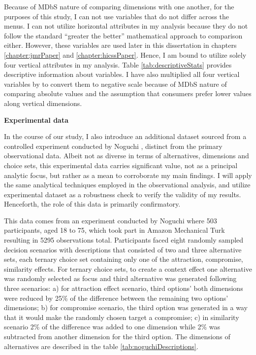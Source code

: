 \documentclass[a4paper,12pt]{article}
\newcommand{\citeyearonly}[1]{\citeyearpar{#1}}
\begin{document}
Because of MDbS nature of comparing dimensions with one another, for the purposes of this study, I can not use variables that do not differ across the menus. I can not utilize horizontal attributes in my analysis because they do not follow the standard ``greater the better'' mathematical approach to comparison either. However, these variables are used later in this dissertation in chapters \ref{chapter:jmrPaper} and \ref{chapter:hicssPaper}. Hence, I am bound to utilize solely four vertical attributes in my analysis. Table \ref{tab:descriptiveStats} provides descriptive information about variables. I have also multiplied all four vertical variables by  to convert them to negative scale because of MDbS nature of comparing absolute values and the assumption that consumers prefer lower values along vertical dimensions.

\textbf{Experimental data}

In the course of our study, I also introduce an additional dataset sourced from a controlled experiment conducted by Noguchi \citeyearonly{noguchi2018multialternative}, distinct from the primary observational data. Albeit not as diverse in terms of alternatives, dimensions and choice sets, this experimental data carries significant value, not as a principal analytic focus, but rather as a mean to corroborate my main findings. I will apply the same analytical techniques employed in the observational analysis, and utilize experimental dataset as a robustness check to verify the validity of my results. Henceforth, the role of this data is primarily confirmatory.

This data comes from an experiment conducted by Noguchi \citeyearonly{noguchi2018multialternative} where 503 participants, aged 18 to 75, which took part in Amazon Mechanical Turk resulting in 5295 observations total. Participants faced eight randomly sampled decision scenarios with descriptions that consisted of two and three alternative sets, each ternary choice set containing only one of the attraction, compromise, similarity effects. For ternary choice sets, to create a context effect one alternative was randomly selected as focus and third alternative was generated following three scenarios: a) for attraction effect scenario, third options' both dimensions were reduced by 25\% of the difference between the remaining two options' dimensions; b) for compromise scenario, the third option was generated in a way that it would make the randomly chosen target a compromise; c) in similarity scenario 2\% of the difference was added to one dimension while 2\% was subtracted from another dimension for the third option. The dimensions of alternatives are described in the table \ref{tab:noguchiDescriptions}.
\end{document}
